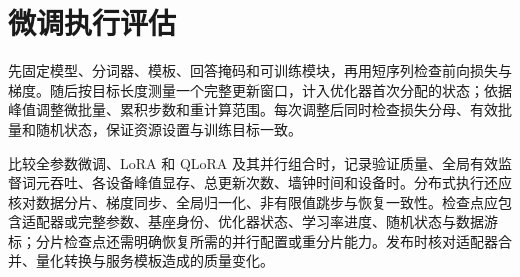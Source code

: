 \documentclass[../textbook.tex]{subfiles}
\begin{document}
\section{微调执行评估}

先固定模型、分词器、模板、回答掩码和可训练模块，再用短序列检查前向损失与梯度。随后按目标长度测量一个完整更新窗口，计入优化器首次分配的状态；依据峰值调整微批量、累积步数和重计算范围。每次调整后同时检查损失分母、有效批量和随机状态，保证资源设置与训练目标一致。

比较全参数微调、LoRA 和 QLoRA 及其并行组合时，记录验证质量、全局有效监督词元吞吐、各设备峰值显存、总更新次数、墙钟时间和设备时。分布式执行还应核对数据分片、梯度同步、全局归一化、非有限值跳步与恢复一致性。检查点应包含适配器或完整参数、基座身份、优化器状态、学习率进度、随机状态与数据游标；分片检查点还需明确恢复所需的并行配置或重分片能力。发布时核对适配器合并、量化转换与服务模板造成的质量变化。

\chapterreferences
\myendchapterdocument
\end{document}

